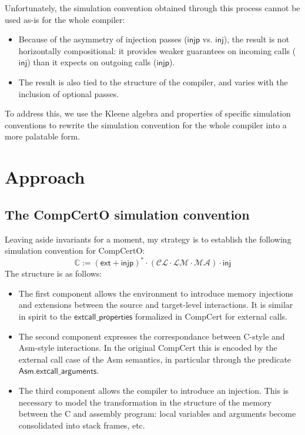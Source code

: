 \documentclass[11pt]{article}
\begin{document}
Unfortunately,
the simulation convention obtained through this process
cannot be used as-is for the whole compiler:
\begin{itemize}
  \item Because of the asymmetry of injection passes
    ($\mathsf{injp}$ vs. $\mathsf{inj}$),
    the result is not horizontally compositional:
    it provides weaker guarantees on incoming calls ($\mathsf{inj}$)
    than it expects on outgoing calls ($\mathsf{injp}$).
  \item The result is also tied to the structure of the compiler,
    and varies with the inclusion of optional passes.
\end{itemize}
To address this,
we use the Kleene algebra and
properties of specific simulation conventions
to rewrite the simulation convention for the whole compiler
into a more palatable form.

\section{Approach}

\subsection{The CompCertO simulation convention}

Leaving aside invariants for a moment,
my strategy is to establish the following
simulation convention for CompCertO:
\[
  \mathbb{C} :=
  (\mathsf{ext} + \mathsf{injp})^* \cdot
  (\mathcal{C\!L} \cdot
   \mathcal{L\!M} \cdot
   \mathcal{M\!A}) \cdot
  \mathsf{inj}
\]
The structure is as follows:
\begin{itemize}
  \item
    The first component
    allows the environment to introduce
    memory injections and extensions
    between the source and target-level interactions.
    It is similar in spirit to the $\mathsf{extcall\_properties}$
    formalized in CompCert for external calls.
  \item
    The second component 
    expresses the correspondance between
    C-style and Asm-style interactions.
    In the original CompCert this is encoded by
    the external call case of the Asm semantics,
    in particular through the predicate
    $\mathsf{Asm.extcall\_arguments}$.
  \item
    The third component allows the compiler to introduce an injection.
    This is necessary to model the transformation in the structure of the memory
    between the C and assembly program:
    local variables and arguments become consolidated into stack frames, etc.
\end{itemize}
\end{document}
